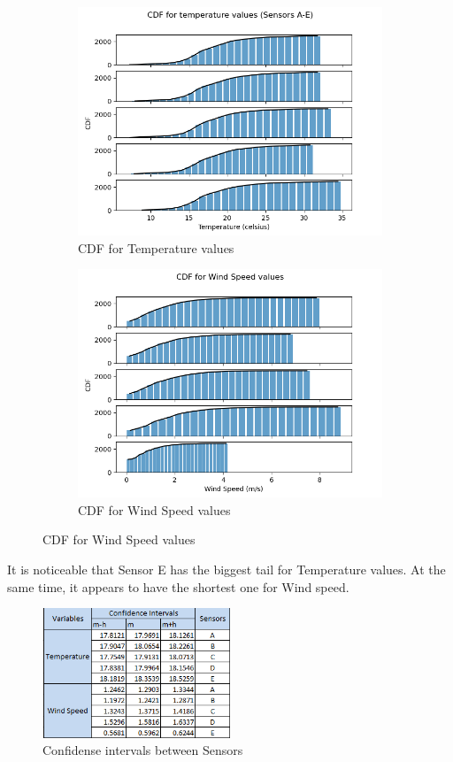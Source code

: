 \documentclass[a4paper,12pt]{article} %
\begin{document}
\begin{figure}[H] %
	\centering %
	\begin{subfigure}[b]{0.4\linewidth}
		\includegraphics[width=0.9\linewidth]{Figure_9.png} 
		\caption{CDF for Temperature values}
	\end{subfigure}
	\begin{subfigure}[b]{0.4\linewidth}
		\includegraphics[width=0.9\linewidth]{Figure_18.png} 
		\caption{CDF for Wind Speed values}
	\end{subfigure}
\end{figure}

It is noticeable that Sensor E has the biggest tail for Temperature values. At the same time, it appears to have the shortest one for Wind speed.

\begin{figure}[H] %
	\centering %
	\includegraphics[width=0.5\textwidth]{Confidence_intervals.png} 
	\caption{Confidense intervals between Sensors} %
\end{figure}
\end{document}
